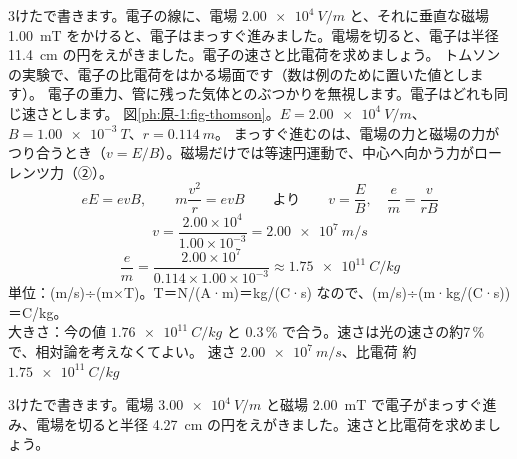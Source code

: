 \label{ph:原-1:ex2}
\begin{phreidai}[トムソンの方法で比電荷をはかる]
3けたで書きます。電子の線に、電場 $\qty{2.00e4}{V/m}$ と、それに垂直な磁場 \qty{1.00}{mT} をかけると、電子はまっすぐ進みました。電場を切ると、電子は半径 \qty{11.4}{cm} の円をえがきました。電子の速さと比電荷を求めましょう。
\phbamen
トムソンの実験で、電子の比電荷をはかる場面です（数は例のために置いた値とします）。
\phmushi
電子の重力、管に残った気体とのぶつかりを無視します。電子はどれも同じ速さとします。
\phzu
図\ref{ph:原-1:fig-thomson}。$E=\qty{2.00e4}{V/m}$、$B=\qty{1.00e-3}{T}$、$r=\qty{0.114}{m}$。
\phriyu
まっすぐ進むのは、電場の力と磁場の力がつり合うとき（$v=E/B$）。磁場だけでは等速円運動で、中心へ向かう力がローレンツ力（②）。
\phtateru
\[ eE=evB,\qquad m\frac{v^2}{r}=evB\qquad\text{より}\qquad v=\frac{E}{B},\quad \frac{e}{m}=\frac{v}{rB} \]
\phtoku
\[ v=\frac{2.00\times10^4}{1.00\times10^{-3}}=\qty{2.00e7}{m/s} \]
\[ \frac{e}{m}=\frac{2.00\times10^7}{0.114\times1.00\times10^{-3}}\approx\qty{1.75e11}{C/kg} \]
\phtashikame
単位：(m/s)÷(m×T)。T＝N/(A·m)＝kg/(C·s) なので、(m/s)÷(m·kg/(C·s))＝C/kg。\\
大きさ：今の値 $\qty{1.76e11}{C/kg}$ と 0.3\,\% で合う。速さは光の速さの約7\,\% で、相対論を考えなくてよい。
\kotae 速さ $\qty{2.00e7}{m/s}$、比電荷 約 $\qty{1.75e11}{C/kg}$
\end{phreidai}
\begin{jibun}
3けたで書きます。電場 $\qty{3.00e4}{V/m}$ と磁場 \qty{2.00}{mT} で電子がまっすぐ進み、電場を切ると半径 \qty{4.27}{cm} の円をえがきました。速さと比電荷を求めましょう。
\end{jibun}

